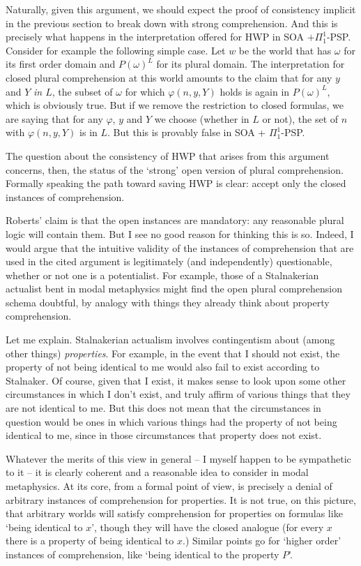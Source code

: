 \documentclass{article}
\begin{document}
Naturally, given this argument, we should expect the proof of consistency implicit in the 
previous section to break down with strong comprehension. And this is precisely 
what happens in the interpretation offered for HWP in SOA $+ \Pi_1^1$-PSP.
Consider for example the following simple case. Let $w$ be the world that has $\omega$
for its first order domain and $P(\omega)^L$ for its plural domain. 
The interpretation for closed plural comprehension at this world amounts to the claim 
that for any $y$ and $Y$ \emph{in $L$}, the subset of $\omega$ for which 
$\varphi(n, y, Y)$ holds is again in $P(\omega)^L$, which is obviously true. But 
if we remove the restriction to closed formulas, we are saying that for any $\varphi$, $y$ and $Y$ 
we choose (whether in $L$ or not), the set of $n$ with $\varphi(n, y, Y)$ is in $L$. 
But this is provably false in SOA + $\Pi_1^1$-PSP.

The question about the consistency of HWP that arises from this argument concerns, then,
the status of the `strong' open version of plural comprehension. Formally speaking 
the path toward saving HWP is clear: accept only the closed instances of comprehension.

Roberts' claim is that the open instances are mandatory:
any reasonable plural logic will contain them. But I see no good reason 
for thinking this is so. Indeed, I would argue that the intuitive validity 
of the instances of comprehension that are used in 
the cited argument is legitimately (and independently) questionable, 
whether or not one is a potentialist. For example, 
those of a Stalnakerian actualist bent in modal metaphysics 
might find the open plural comprehension schema doubtful, by analogy with things they 
already think about property comprehension.

Let me explain. Stalnakerian actualism involves contingentism about 
(among other things) \emph{properties}. For example, 
in the event that I should not exist, the property of not being 
identical to me would also fail to exist according to Stalnaker. Of course, 
given that I exist, it makes sense to look upon some 
other circumstances in which I don't exist, and truly affirm 
of various things that they are not identical to me. 
But this does not mean that the circumstances in question would 
be ones in which various things had the property of not being 
identical to me, since in those circumstances that property 
does not exist. 

Whatever the merits of this view in general -- I myself 
happen to be sympathetic to it -- it is clearly coherent and 
a reasonable idea to consider in modal metaphysics. At its 
core, from a formal point of view, is precisely a denial of 
arbitrary instances of comprehension for properties. It is 
not true, on this picture, that arbitrary worlds will satisfy comprehension for 
properties on formulas like `being identical to $x$', though 
they will have the closed analogue (for every $x$ there is a property 
of being identical to $x$.) Similar points go for `higher order' instances 
of comprehension, like `being identical to the property $P$'.
\end{document}
